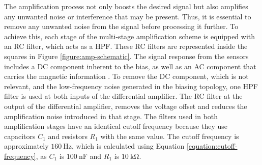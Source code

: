 The amplification process not only boosts the desired signal but also amplifies any unwanted noise or interference that may be present. Thus, it is essential to remove any unwanted noise from the signal before processing it further. To achieve this, each stage of the multi-stage amplification scheme is equipped with an \ac{RC} filter, which acts as a \ac{HPF}. These \ac{RC} filters are represented inside the squares in Figure \ref{figure:amp-schematic}. The signal response from the sensors includes a \ac{DC} component inherent to the bias, as well as an \ac{AC} component that carries the magnetic information \cite{DiogoC_thesis}. To remove the \ac{DC} component, which is not relevant, and the low-frequency noise generated in the biasing topology, one \ac{HPF} filter is used at both inputs of the differential amplifier. The \ac{RC} filter at the output of the differential amplifier, removes the voltage offset and reduces the amplification noise introduced in that stage. The filters used in both amplification stages have an identical cutoff frequency because they use capacitors $C_1$ and resistors $R_1$ with the same value. The cutoff frequency is approximately $\mathrm{160~Hz}$, which is calculated using Equation \ref{equation:cutoff-frequency}, as $C_1$ is $\mathrm{100~nF}$ and $R_1$ is $\mathrm{10~k\Omega}$.

